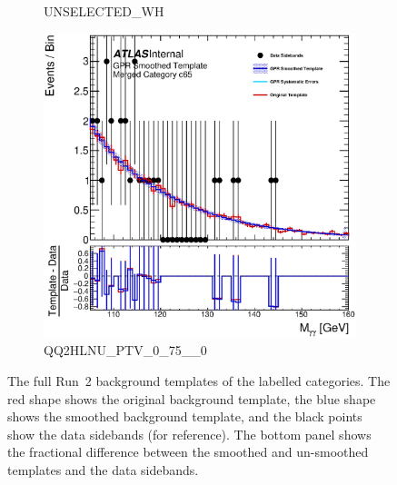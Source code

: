 \begin{figure}
\begin{center}
\begin{subfigure}[T]{0.49\linewidth}
	\caption{UNSELECTED\_WH}
\end{subfigure}
\begin{subfigure}[T]{0.49\linewidth}
	\centering
	\includegraphics[width=\linewidth]{figures/background/gpr/coupCatTemplates/GPR_Smoothed_Plot_hmgg_c65.eps}
	\caption{QQ2HLNU\_PTV\_0\_75\_\_0}
\end{subfigure}
\caption{The full Run~2 background templates of the labelled categories. The red shape shows the original background template, the blue shape shows the smoothed background template, and the black points show the data sidebands (for reference). The bottom panel shows the fractional difference between the smoothed and un-smoothed templates and the data sidebands. }
\label{fig:gpr_coupcat_16}
\end{center}
\end{figure}

